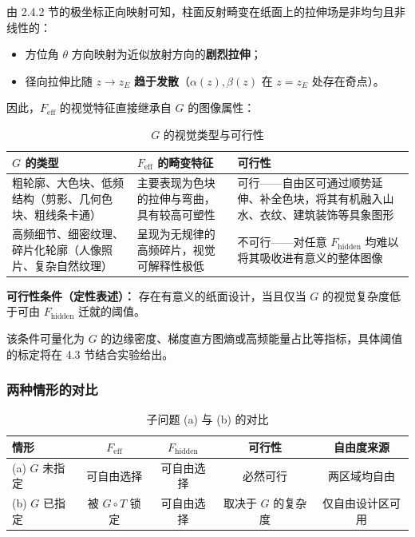 \documentclass[12pt,a4paper]{ctexart}
\begin{document}
由 2.4.2 节的极坐标正向映射可知，柱面反射畸变在纸面上的拉伸场是非均匀且非线性的：
\begin{itemize}
    \item 方位角 $\theta$ 方向映射为近似放射方向的\textbf{剧烈拉伸}；
    \item 径向拉伸比随 $z\to z_E$ \textbf{趋于发散}（$\alpha(z),\beta(z)$ 在 $z=z_E$ 处存在奇点）。
\end{itemize}

因此，$F_{\mathrm{eff}}$ 的视觉特征直接继承自 $G$ 的图像属性：

\begin{table}[htbp]
\centering
\caption{$G$ 的视觉类型与可行性}
\label{tab:feasibility-b}
\begin{tabular}{p{4cm}p{5cm}p{5cm}}
\toprule
$G$ 的类型 & $F_{\mathrm{eff}}$ 的畸变特征 & 可行性 \\
\midrule
粗轮廓、大色块、低频结构（剪影、几何色块、粗线条卡通） & 主要表现为色块的拉伸与弯曲，具有较高可塑性 & 可行——自由区可通过顺势延伸、补全色块，将其有机融入山水、衣纹、建筑装饰等具象图形 \\
高频细节、细密纹理、碎片化轮廓（人像照片、复杂自然纹理） & 呈现为无规律的高频碎片，视觉可解释性极低 & 不可行——对任意 $F_{\mathrm{hidden}}$ 均难以将其吸收进有意义的整体图像 \\
\bottomrule
\end{tabular}
\end{table}

\textbf{可行性条件（定性表述）：} 存在有意义的纸面设计，当且仅当 $G$ 的视觉复杂度低于可由 $F_{\mathrm{hidden}}$ 迁就的阈值。

该条件可量化为 $G$ 的边缘密度、梯度直方图熵或高频能量占比等指标，具体阈值的标定将在 4.3 节结合实验给出。

\subsubsection{两种情形的对比}

\begin{table}[htbp]
\centering
\caption{子问题 (a) 与 (b) 的对比}
\label{tab:compare-ab}
\begin{tabular}{lcccc}
\toprule
情形 & $F_{\mathrm{eff}}$ & $F_{\mathrm{hidden}}$ & 可行性 & 自由度来源 \\
\midrule
(a) $G$ 未指定 & 可自由选择 & 可自由选择 & 必然可行 & 两区域均自由 \\
(b) $G$ 已指定 & 被 $G\circ T$ 锁定 & 可自由选择 & 取决于 $G$ 的复杂度 & 仅自由设计区可用 \\
\bottomrule
\end{tabular}
\end{table}
\end{document}
